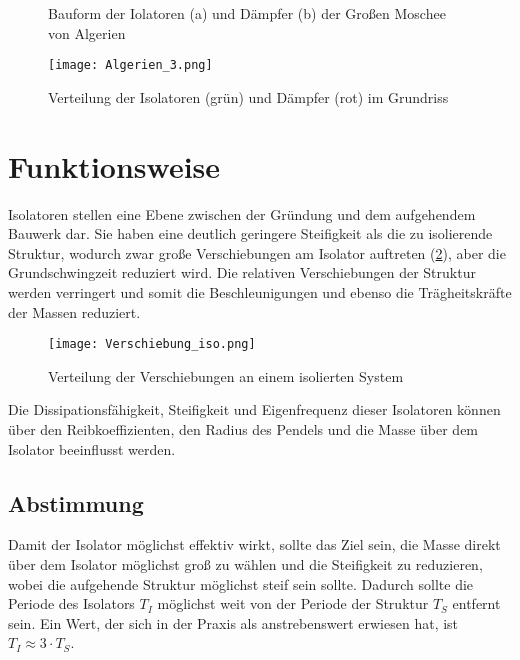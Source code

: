 \begin{figure}[H]
    \centering
    \qquad
    \caption{Bauform der Iolatoren (a) und Dämpfer (b) der Großen Moschee von Algerien \cite{AKK}}%
\end{figure}

\begin{figure}[H]
    \centering
    \texttt{[image: Algerien\_3.png]}
    \caption{Verteilung der Isolatoren (grün) und Dämpfer (rot) im Grundriss \cite{AKK}}
	\label{Dampener}
\end{figure}

\pagebreak

\section{Funktionsweise}
\label{sec:funktion}

Isolatoren stellen eine Ebene zwischen der Gründung und dem aufgehendem Bauwerk dar. Sie haben eine deutlich geringere Steifigkeit als die zu isolierende Struktur, wodurch zwar große Verschiebungen am Isolator auftreten (\cref{Verteilung}), aber die Grundschwingzeit reduziert wird.
Die relativen Verschiebungen der Struktur werden verringert und somit die Beschleunigungen und ebenso die Trägheitskräfte der Massen reduziert.

\begin{figure}[h]
    \centering
    \texttt{[image: Verschiebung\_iso.png]}
    \caption{Verteilung der Verschiebungen an einem isolierten System \cite{Kelly}}
	\label{Verteilung}
\end{figure}

Die Dissipationsfähigkeit, Steifigkeit und Eigenfrequenz dieser Isolatoren können über den Reibkoeffizienten, den Radius des Pendels und die Masse über dem Isolator beeinflusst werden.

\subsection{Abstimmung}
\label{sec:abstimmung}

Damit der Isolator möglichst effektiv wirkt, sollte das Ziel sein, die Masse direkt über dem Isolator möglichst groß zu wählen und die Steifigkeit zu reduzieren, wobei die aufgehende Struktur möglichst steif sein sollte.
Dadurch sollte die Periode des Isolators $T_I$ möglichst weit von der Periode der Struktur $T_S$ entfernt sein.
Ein Wert, der sich in der Praxis als anstrebenswert erwiesen hat, ist $T_I \approx 3 \cdot T_S$.

